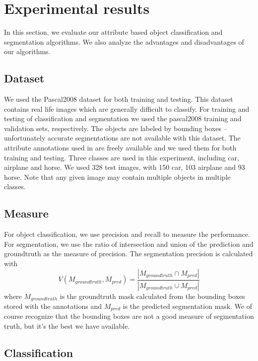 \documentclass[10pt,twocolumn,letterpaper]{article}
\begin{document}
\section{Experimental results}
\label{sec:results}


In this section, we evaluate our attribute based object classification
and segmentation algorithms. We also analyze the advantages and 
disadvantages of our algorithms.\\

\subsection{Dataset}
\label{ssec:dataset}

We used the Pascal2008 dataset for both training and testing. This dataset contains real life
images which are generally difficult to classify. 
For training and testing of classification and
segmentation we used the pascal2008 training and validation sets, respectively.
The objects are labeled
by bounding boxes -- unfortunately accurate segmentations are not available
with this dataset.  The attribute
annotations used in \cite{farhadi09} are freely available and we
used them for both training and testing. Three classes are used in this experiment, including car,
airplane and horse. We used 328 test images, with 150 car, 103 airplane and 93 horse. 
Note that any given image may
contain multiple objects in multiple classes.\\

\subsection{Measure}
\label{ssec:measure}

For object classification, we use precision and recall to measure the performance. 
For segmentation, we use the ratio of intersection and union of the prediction and 
groundtruth as the measure of precision. The segmentation
precision is calculated with
\[ V(M_{groundtruth},M_{pred}) = \frac{|M_{groundtruth} \cap M_{pred}|}{|M_{groundtruth} \cup M_{pred}|} \]
where $M_{groundtruth}$ is the groundtruth mask calculated from the
bounding boxes stored with the annotations and $M_{pred}$ is the
predicted segmentation mask.  We of course recognize that the
bounding boxes are not a good measure of segmentation truth, but
it's the best we have available.\\

\subsection{Classification}
\label{ssec:classification}
\end{document}
